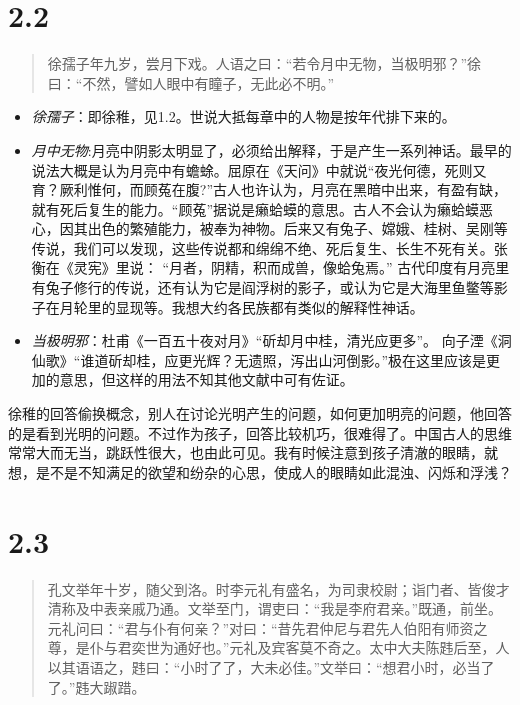\documentclass[]{book}
\providecommand{\tightlist}{%
  \setlength{\itemsep}{0pt}\setlength{\parskip}{0pt}}
\begin{document}
\section{2.2}\label{section-48}

\begin{quote}
徐孺子年九岁，尝月下戏。人语之曰：``若令月中无物，当极明邪？''徐曰：``不然，譬如人眼中有瞳子，无此必不明。''
\end{quote}

\begin{itemize}
\tightlist
\item
  \emph{徐孺子}：即徐稚，见1.2。世说大抵每章中的人物是按年代排下来的。
\item
  \emph{月中无物}:月亮中阴影太明显了，必须给出解释，于是产生一系列神话。最早的说法大概是认为月亮中有蟾蜍。屈原在《天问》中就说``夜光何德，死则又育？厥利惟何，而顾菟在腹?''古人也许认为，月亮在黑暗中出来，有盈有缺，就有死后复生的能力。``顾菟''据说是癞蛤蟆的意思。古人不会认为癞蛤蟆恶心，因其出色的繁殖能力，被奉为神物。后来又有兔子、嫦娥、桂树、吴刚等传说，我们可以发现，这些传说都和绵绵不绝、死后复生、长生不死有关。张衡在《灵宪》里说：
  ``月者，阴精，积而成兽，像蛤兔焉。''
  古代印度有月亮里有兔子修行的传说，还有认为它是阎浮树的影子，或认为它是大海里鱼鳖等影子在月轮里的显现等。我想大约各民族都有类似的解释性神话。
\item
  \emph{当极明邪}：杜甫《一百五十夜对月》``斫却月中桂，清光应更多''。
  向子湮《洞仙歌》``谁道斫却桂，应更光辉？无遗照，泻出山河倒影。''极在这里应该是更加的意思，但这样的用法不知其他文献中可有佐证。
\end{itemize}

徐稚的回答偷换概念，别人在讨论光明产生的问题，如何更加明亮的问题，他回答的是看到光明的问题。不过作为孩子，回答比较机巧，很难得了。中国古人的思维常常大而无当，跳跃性很大，也由此可见。我有时候注意到孩子清澈的眼睛，就想，是不是不知满足的欲望和纷杂的心思，使成人的眼睛如此混浊、闪烁和浮浅？

\section{2.3}\label{section-49}

\begin{quote}
孔文举年十岁，随父到洛。时李元礼有盛名，为司隶校尉；诣门者、皆俊才清称及中表亲戚乃通。文举至门，谓吏曰：``我是李府君亲。''既通，前坐。元礼问曰：``君与仆有何亲？''对曰：``昔先君仲尼与君先人伯阳有师资之尊，是仆与君奕世为通好也。''元礼及宾客莫不奇之。太中大夫陈韪后至，人以其语语之，韪曰：``小时了了，大未必佳。''文举曰：``想君小时，必当了了。''韪大踧踖。
\end{quote}
\end{document}
